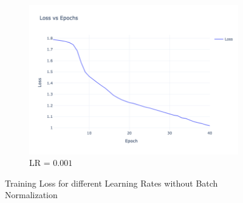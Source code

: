 \begin{figure}[htbp!]
    \begin{subfigure}{0.32\textwidth}
    \centering
    \includegraphics[width=\textwidth]{images/CNN-3-train-loss-lr_0.001.png}
    \caption{LR = $0.001$}
    \end{subfigure}
    \caption{Training Loss for different Learning Rates without Batch Normalization}
    \label{fig:training_loss_comparison}
    \end{figure}
